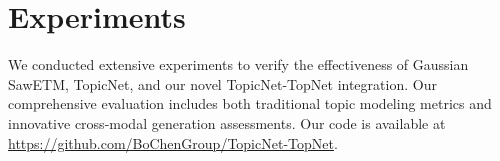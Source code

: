 \documentclass{article}
\begin{document}
\section{Experiments} 
We conducted extensive experiments to verify the effectiveness of Gaussian SawETM, TopicNet, and our novel TopicNet-TopNet integration. Our comprehensive evaluation includes both traditional topic modeling metrics and innovative cross-modal generation assessments. Our code is available at \url{https://github.com/BoChenGroup/TopicNet-TopNet}.  
\end{document}
